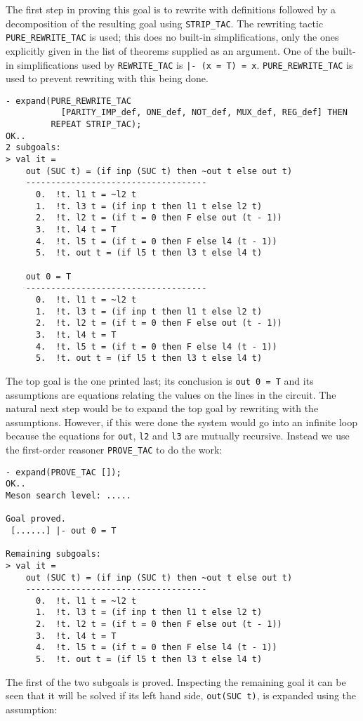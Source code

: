 The first step in proving this goal is to rewrite with definitions
followed by a decomposition of the resulting goal using
{\small\verb|STRIP_TAC|}. The rewriting tactic
{\small\verb|PURE_REWRITE_TAC|} is used; this does no built-in
simplifications, only the ones explicitly given in the list of
theorems supplied as an argument.  One of the built-in simplifications
used by {\small\verb|REWRITE_TAC|} is {\small\tt |-~(x~=~T)~=~x}.
{\small\verb|PURE_REWRITE_TAC|} is used to prevent rewriting with this
being done.
\begin{session}
\begin{verbatim}
- expand(PURE_REWRITE_TAC
           [PARITY_IMP_def, ONE_def, NOT_def, MUX_def, REG_def] THEN
         REPEAT STRIP_TAC);
OK..
2 subgoals:
> val it =
    out (SUC t) = (if inp (SUC t) then ~out t else out t)
    ------------------------------------
      0.  !t. l1 t = ~l2 t
      1.  !t. l3 t = (if inp t then l1 t else l2 t)
      2.  !t. l2 t = (if t = 0 then F else out (t - 1))
      3.  !t. l4 t = T
      4.  !t. l5 t = (if t = 0 then F else l4 (t - 1))
      5.  !t. out t = (if l5 t then l3 t else l4 t)

    out 0 = T
    ------------------------------------
      0.  !t. l1 t = ~l2 t
      1.  !t. l3 t = (if inp t then l1 t else l2 t)
      2.  !t. l2 t = (if t = 0 then F else out (t - 1))
      3.  !t. l4 t = T
      4.  !t. l5 t = (if t = 0 then F else l4 (t - 1))
      5.  !t. out t = (if l5 t then l3 t else l4 t)
\end{verbatim}
\end{session}

The top goal is the one printed last; its conclusion is
{\small\verb|out 0 = T|} and its assumptions are equations relating
the values on the lines in the circuit.  The natural next step would
be to expand the top goal by rewriting with the assumptions.  However,
if this were done the system would go into an infinite loop because
the equations for {\small\verb|out|}, {\small\verb|l2|} and
{\small\verb|l3|} are mutually recursive.  Instead we use the
first-order reasoner {\small\verb|PROVE_TAC|} to do the work:

\begin{session}
\begin{verbatim}
- expand(PROVE_TAC []);
OK..
Meson search level: .....

Goal proved.
 [......] |- out 0 = T

Remaining subgoals:
> val it =
    out (SUC t) = (if inp (SUC t) then ~out t else out t)
    ------------------------------------
      0.  !t. l1 t = ~l2 t
      1.  !t. l3 t = (if inp t then l1 t else l2 t)
      2.  !t. l2 t = (if t = 0 then F else out (t - 1))
      3.  !t. l4 t = T
      4.  !t. l5 t = (if t = 0 then F else l4 (t - 1))
      5.  !t. out t = (if l5 t then l3 t else l4 t)
\end{verbatim}
\end{session}
The first of the two subgoals is proved.  Inspecting the remaining
goal it can be seen that it will be solved if its left hand side,
{\small\verb|out(SUC t)|}, is expanded using the assumption: \medskip

